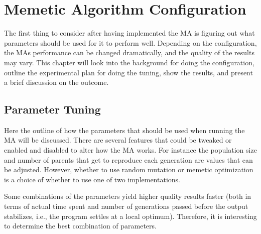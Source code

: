 \chapter{Memetic Algorithm Configuration} %
\label{cha:evolutionary_algorithm_configuration}

The first thing to consider after having implemented the MA is figuring out what parameters should be used for it to perform well. Depending on the configuration, the MAs performance can be changed dramatically, and the quality of the results may vary. This chapter will look into the background for doing the configuration, outline the experimental plan for doing the tuning, show the results, and present a brief discussion on the outcome.

\section{Parameter Tuning} %
\label{sec:background_and_motivation}
Here the outline of how the parameters that should be used when running the MA will be discussed. There are several features that could be tweaked or enabled and disabled to alter how the MA works. For instance the population size and number of parents that get to reproduce each generation are values that can be adjusted. However, whether to use random mutation or memetic optimization is a choice of whether to use one of two implementations.

Some combinations of the parameters yield higher quality results faster (both in terms of actual time spent and number of generations passed before the output stabilizes, i.e., the program settles at a local optimum). Therefore, it is interesting to determine the best combination of parameters.


